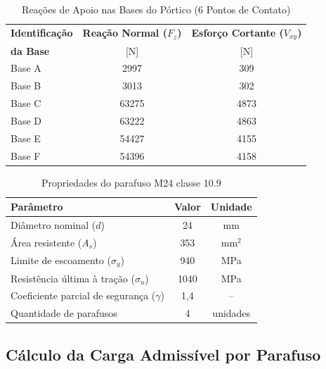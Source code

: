 \documentclass[12pt, a4paper]{article}
\begin{document}
\begin{table}[h!]
    \centering
    \caption{Reações de Apoio nas Bases do Pórtico (6 Pontos de Contato)}
    \label{tab:reacoes_6_bases}
    \renewcommand{\arraystretch}{1.2}
    
    \begin{tabular}{|l|c|c|}
        \toprule
        \textbf{Identificação} & \textbf{Reação Normal ($F_z$)} & \textbf{Esforço Cortante ($V_{xy}$)} \\ 
        \textbf{da Base} & [N] & [N]\\ \midrule
        Base A   & 2997 & 309\\
        Base B   & 3013 & 302\\
        Base C   & 63275 & 4873\\
        Base D   & 63222 & 4863\\
        Base E   & 54427 & 4155 \\
        Base F   & 54396 & 4158 \\ 
        \bottomrule
        
    \end{tabular}
    \vspace{0.2cm}
\end{table}



\begin{table}[h!]
\centering
\caption{Propriedades do parafuso M24 classe 10.9}
\label{tab:propriedades_parafuso}
\renewcommand{\arraystretch}{1.2}

\begin{tabular}{|l|c|c|}
\toprule
\textbf{Parâmetro} & \textbf{Valor} & \textbf{Unidade} \\
\midrule
Diâmetro nominal ($d$) & 24 & mm \\
Área resistente ($A_s$) & 353 & mm$^2$ \\
Limite de escoamento ($\sigma_{y}$) & 940 & MPa \\
Resistência última à tração ($\sigma_{u}$) & 1040 & MPa \\
Coeficiente parcial de segurança ($\gamma$) & 1,4 & -- \\
Quantidade de parafusos & 4 & unidades \\
\bottomrule
\end{tabular}
\end{table}

\subsection{Cálculo da Carga Admissível por Parafuso}
\end{document}
